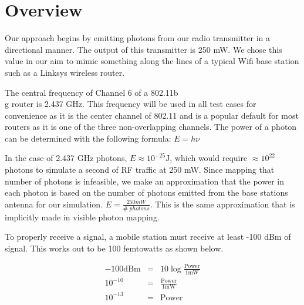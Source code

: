 \documentclass[%
        final,
        notitlepage,
        narroweqnarray,
        inline,
        twoside,
        ]{ieee}
\begin{document}




\section{Overview}
Our approach begins by emitting photons from our radio transmitter in a
directional manner.  The output of this transmitter is 250 mW.  We chose this
value in our aim to mimic something along the lines of a typical Wifi base
station such as a Linksys wireless router. 

The central frequency of Channel 6 of a 802.11b\\g router is 2.437 GHz. This frequency
will be used in all test cases for convenience as it is the center channel of 802.11 and
is a popular default for most routers as it is one of the three non-overlapping channels. 
The power of a photon can be determined with the following formula: $E = h\nu$

In the case of 2.437 GHz photons, $E \approx 10^{-25} \mathrm{J}$, which would require $\approx 10^{22}$
photons to simulate a second of RF traffic at 250 mW. Since mapping that number of photons is infeasible, 
we make an approximation that the power in each photon is based on the number of photons emitted from the base 
stations antenna for our simulation. $E = \frac{250mW}{\#\;photons}$. This is the same approximation that is
implicitly made in visible photon mapping.

To properly receive a signal, a mobile station must receive at least -100 dBm of signal. 
This works out to be 100 femtowatts as shown below.

\begin{eqnarray}
	-100 \mathrm{dBm} & = & 10\log\frac{\mathrm{Power}}{1\mathrm{mW}} \\
	10^{-10} & = & \frac{\mathrm{Power}}{1\mathrm{mW}} \\
	10^{-13} & = & \mathrm{Power}
\end{eqnarray}
\end{document}
